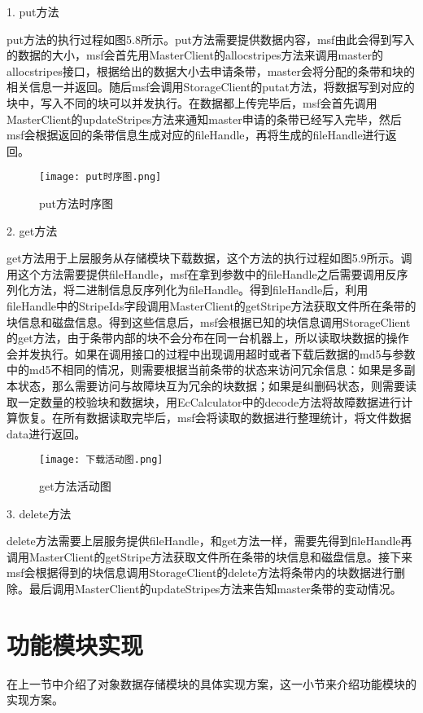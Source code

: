 1. put方法

put方法的执行过程如图5.8所示。put方法需要提供数据内容，msf由此会得到写入的数据的大小，msf会首先用MasterClient的allocstripes方法来调用master的allocstripes接口，根据给出的数据大小去申请条带，master会将分配的条带和块的相关信息一并返回。随后msf会调用StorageClient的putat方法，将数据写到对应的块中，写入不同的块可以并发执行。在数据都上传完毕后，msf会首先调用MasterClient的updateStripes方法来通知master申请的条带已经写入完毕，然后msf会根据返回的条带信息生成对应的fileHandle，再将生成的fileHandle进行返回。

\begin{figure}[h]
  \centering
  \texttt{[image: put时序图.png]}
  \caption{put方法时序图}
\end{figure}

2. get方法

get方法用于上层服务从存储模块下载数据，这个方法的执行过程如图5.9所示。调用这个方法需要提供fileHandle，msf在拿到参数中的fileHandle之后需要调用反序列化方法，将二进制信息反序列化为fileHandle。得到fileHandle后，利用fileHandle中的StripeIds字段调用MasterClient的getStripe方法获取文件所在条带的块信息和磁盘信息。得到这些信息后，msf会根据已知的块信息调用StorageClient的get方法，由于条带内部的块不会分布在同一台机器上，所以读取块数据的操作会并发执行。如果在调用接口的过程中出现调用超时或者下载后数据的md5与参数中的md5不相同的情况，则需要根据当前条带的状态来访问冗余信息：如果是多副本状态，那么需要访问与故障块互为冗余的块数据；如果是纠删码状态，则需要读取一定数量的校验块和数据块，用EcCalculator中的decode方法将故障数据进行计算恢复。在所有数据读取完毕后，msf会将读取的数据进行整理统计，将文件数据data进行返回。

\begin{figure}[h]
  \centering
  \texttt{[image: 下载活动图.png]}
  \caption{get方法活动图}
\end{figure}

3. delete方法

delete方法需要上层服务提供fileHandle，和get方法一样，需要先得到fileHandle再调用MasterClient的getStripe方法获取文件所在条带的块信息和磁盘信息。接下来msf会根据得到的块信息调用StorageClient的delete方法将条带内的块数据进行删除。最后调用MasterClient的updateStripes方法来告知master条带的变动情况。

\section{功能模块实现}%
在上一节中介绍了对象数据存储模块的具体实现方案，这一小节来介绍功能模块的实现方案。

